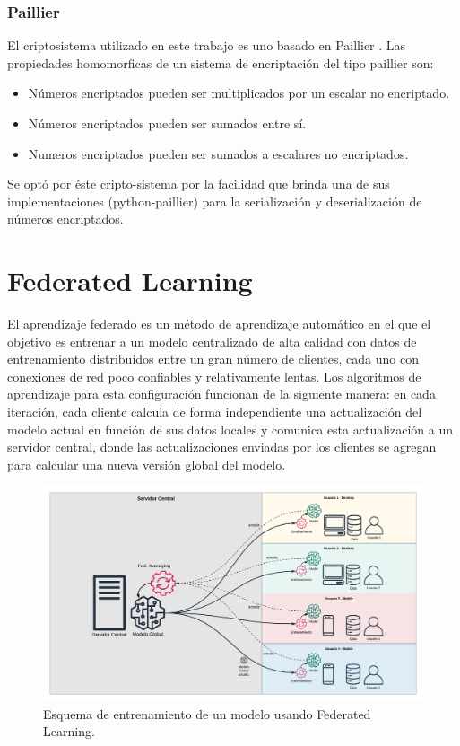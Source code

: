 \documentclass[
11pt, %
oneside, %
spanish, %
singlespacing, %
parskip, %
headsepline, %
chapterinoneline, %
]{MastersDoctoralThesis} %
\begin{document}
\subsubsection*{Paillier}
El criptosistema utilizado en este trabajo es uno basado en Paillier \cite{paillier}. 
Las propiedades homomorficas de un sistema de encriptación del tipo paillier son:

\begin{itemize}
\item Números encriptados pueden ser multiplicados por un escalar no encriptado.
\item Números encriptados pueden ser sumados entre sí.
\item Numeros encriptados pueden ser sumados a escalares no encriptados.
\end{itemize}

Se optó por éste cripto-sistema por la facilidad que brinda una de sus implementaciones (python-paillier) para la serialización y deserialización de números encriptados. 

\section{Federated Learning}
El aprendizaje federado \cite{fedlearn2} \cite{fedlearn1} \cite{fedlearn3} \cite{fedlearn4} \cite{fedlearn5} \cite{fedlearn6} es un método de aprendizaje automático en el que el objetivo es entrenar a un modelo centralizado de alta calidad con datos de entrenamiento distribuidos entre un gran número de clientes, cada uno con conexiones de red poco confiables y relativamente lentas. Los algoritmos de aprendizaje para esta configuración funcionan de la siguiente manera: en cada iteración, cada cliente calcula de forma independiente una actualización del modelo actual en función de sus datos locales y comunica esta actualización a un servidor central, donde las actualizaciones enviadas por los clientes se agregan para calcular una nueva versión global del modelo.

\begin{figure}[H]
  	\centering
	\includegraphics[scale=0.42]{imgs/fl_flow.png}
	\caption{Esquema de entrenamiento de un modelo usando Federated Learning.}
\end{figure}
\end{document}
